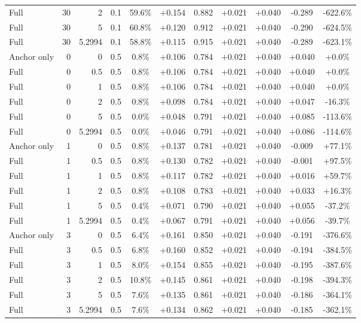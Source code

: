 \begin{table}[htbp]
\begin{tabular}{lrrrccccccc}
Full & 30 & 2 & 0.1 & 59.6\% & +0.154 & 0.882 & +0.021 & +0.040 & -0.289 & -622.6\% \\
Full & 30 & 5 & 0.1 & 60.8\% & +0.120 & 0.912 & +0.021 & +0.040 & -0.290 & -624.5\% \\
Full & 30 & 5.2994 & 0.1 & 58.8\% & +0.115 & 0.915 & +0.021 & +0.040 & -0.289 & -623.1\% \\
Anchor only & 0 & 0 & 0.5 & 0.8\% & +0.106 & 0.784 & +0.021 & +0.040 & +0.040 & +0.0\% \\
Full & 0 & 0.5 & 0.5 & 0.8\% & +0.106 & 0.784 & +0.021 & +0.040 & +0.040 & +0.0\% \\
Full & 0 & 1 & 0.5 & 0.8\% & +0.106 & 0.784 & +0.021 & +0.040 & +0.040 & +0.0\% \\
Full & 0 & 2 & 0.5 & 0.8\% & +0.098 & 0.784 & +0.021 & +0.040 & +0.047 & -16.3\% \\
Full & 0 & 5 & 0.5 & 0.0\% & +0.048 & 0.791 & +0.021 & +0.040 & +0.085 & -113.6\% \\
Full & 0 & 5.2994 & 0.5 & 0.0\% & +0.046 & 0.791 & +0.021 & +0.040 & +0.086 & -114.6\% \\
Anchor only & 1 & 0 & 0.5 & 0.8\% & +0.137 & 0.781 & +0.021 & +0.040 & -0.009 & +77.1\% \\
Full & 1 & 0.5 & 0.5 & 0.8\% & +0.130 & 0.782 & +0.021 & +0.040 & -0.001 & +97.5\% \\
Full & 1 & 1 & 0.5 & 0.8\% & +0.117 & 0.782 & +0.021 & +0.040 & +0.016 & +59.7\% \\
Full & 1 & 2 & 0.5 & 0.8\% & +0.108 & 0.783 & +0.021 & +0.040 & +0.033 & +16.3\% \\
Full & 1 & 5 & 0.5 & 0.4\% & +0.071 & 0.790 & +0.021 & +0.040 & +0.055 & -37.2\% \\
Full & 1 & 5.2994 & 0.5 & 0.4\% & +0.067 & 0.791 & +0.021 & +0.040 & +0.056 & -39.7\% \\
Anchor only & 3 & 0 & 0.5 & 6.4\% & +0.161 & 0.850 & +0.021 & +0.040 & -0.191 & -376.6\% \\
Full & 3 & 0.5 & 0.5 & 6.8\% & +0.160 & 0.852 & +0.021 & +0.040 & -0.194 & -384.5\% \\
Full & 3 & 1 & 0.5 & 8.0\% & +0.154 & 0.855 & +0.021 & +0.040 & -0.195 & -387.6\% \\
Full & 3 & 2 & 0.5 & 10.8\% & +0.145 & 0.861 & +0.021 & +0.040 & -0.198 & -394.3\% \\
Full & 3 & 5 & 0.5 & 7.6\% & +0.135 & 0.861 & +0.021 & +0.040 & -0.186 & -364.1\% \\
Full & 3 & 5.2994 & 0.5 & 7.6\% & +0.134 & 0.862 & +0.021 & +0.040 & -0.185 & -362.1\% \\

\end{tabular}
\end{table}
